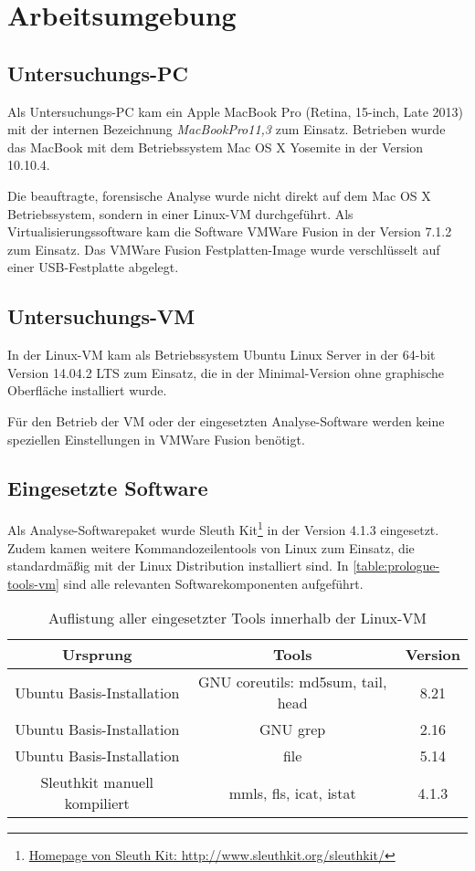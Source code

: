 \section{Arbeitsumgebung}
\label{sec:env}

\subsection{Untersuchungs-PC}
Als Untersuchungs-PC kam ein Apple MacBook Pro (Retina, 15-inch, Late 2013) mit der  internen Bezeichnung \textit{MacBookPro11,3} zum Einsatz. Betrieben wurde das MacBook mit dem Betriebssystem Mac OS X Yosemite in der Version 10.10.4.

Die beauftragte, forensische Analyse wurde nicht direkt auf dem Mac OS X Betriebssystem, sondern in einer Linux-VM durchgeführt. Als Virtualisierungssoftware kam die Software VMWare Fusion in der Version 7.1.2 zum Einsatz. Das VMWare Fusion Festplatten-Image wurde verschlüsselt auf einer USB-Festplatte abgelegt.

\subsection{Untersuchungs-VM}

In der Linux-VM kam als Betriebssystem Ubuntu Linux Server in der 64-bit Version 14.04.2 LTS zum Einsatz, die in der Minimal-Version ohne graphische Oberfläche installiert wurde. 

Für den Betrieb der VM oder der eingesetzten Analyse-Software werden keine speziellen Einstellungen in VMWare Fusion benötigt.

\subsection{Eingesetzte Software}

Als Analyse-Softwarepaket wurde Sleuth Kit\footnote{\href{http://www.sleuthkit.org/sleuthkit/}{Homepage von Sleuth Kit: http://www.sleuthkit.org/sleuthkit/}} in der Version 4.1.3 eingesetzt. Zudem kamen weitere Kommandozeilentools von Linux zum Einsatz, die standardmäßig mit der Linux Distribution installiert sind. In \autoref{table:prologue-tools-vm} sind alle relevanten Softwarekomponenten aufgeführt.

\begin{table}[H]
\centering
\begin{tabular}{ccc}
\hline 
Ursprung & Tools & Version \\ 
\hline 
Ubuntu Basis-Installation & GNU coreutils: md5sum, tail, head & 8.21 \\ 
\hline 
Ubuntu Basis-Installation & GNU grep & 2.16 \\ 
\hline 
Ubuntu Basis-Installation & file & 5.14 \\ 
\hline 
Sleuthkit manuell kompiliert & mmls, fls, icat, istat & 4.1.3 \\ 
\hline 
\end{tabular} 
\caption{Auflistung aller eingesetzter Tools innerhalb der Linux-VM}
\label{table:prologue-tools-vm}
\end{table}

